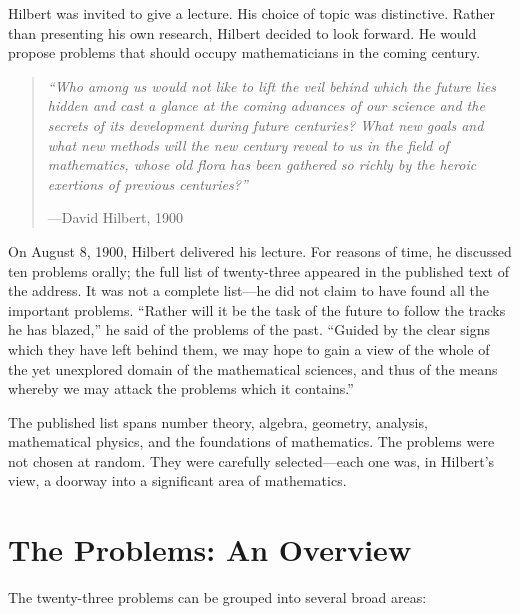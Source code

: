 Hilbert was invited to give a lecture. His choice of topic was distinctive. Rather than presenting his own research, Hilbert decided to look forward. He would propose problems that should occupy mathematicians in the coming century.

\begin{quote}
\textit{``Who among us would not like to lift the veil behind which the future lies hidden and cast a glance at the coming advances of our science and the secrets of its development during future centuries? What new goals and what new methods will the new century reveal to us in the field of mathematics, whose old flora has been gathered so richly by the heroic exertions of previous centuries?''}
\par\hfill ---David Hilbert, 1900
\end{quote}

On August 8, 1900, Hilbert delivered his lecture. For reasons of time, he discussed ten problems orally; the full list of twenty-three appeared in the published text of the address. It was not a complete list---he did not claim to have found all the important problems. ``Rather will it be the task of the future to follow the tracks he has blazed,'' he said of the problems of the past. ``Guided by the clear signs which they have left behind them, we may hope to gain a view of the whole of the yet unexplored domain of the mathematical sciences, and thus of the means whereby we may attack the problems which it contains.''

The published list spans number theory, algebra, geometry, analysis, mathematical physics, and the foundations of mathematics. The problems were not chosen at random. They were carefully selected---each one was, in Hilbert's view, a doorway into a significant area of mathematics.

\section{The Problems: An Overview}

The twenty-three problems can be grouped into several broad areas:

